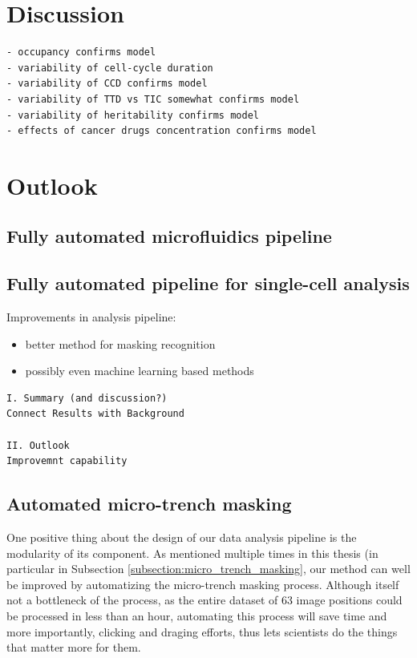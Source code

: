 \documentclass[pdftex,12pt,a4paper]{report}
\begin{document}

\section{Discussion}

\begin{verbatim}
- occupancy confirms model
- variability of cell-cycle duration
- variability of CCD confirms model
- variability of TTD vs TIC somewhat confirms model
- variability of heritability confirms model
- effects of cancer drugs concentration confirms model
\end{verbatim}

\section{Outlook}

\subsection{Fully automated microfluidics pipeline}

\subsection{Fully automated pipeline for single-cell analysis}


Improvements in analysis pipeline:

\begin{itemize}
\item better method for masking recognition
\item possibly even machine learning based methods
\end{itemize}

\begin{verbatim}
I. Summary (and discussion?)
Connect Results with Background

II. Outlook
Improvemnt capability
\end{verbatim}

\subsection{Automated micro-trench masking}

One positive thing about the design of our data analysis pipeline is the modularity of its component. As mentioned multiple times in this thesis (in particular in Subsection \ref{subsection:micro_trench_masking}, our method can well be improved by automatizing the micro-trench masking process. Although itself not a bottleneck of the process, as the entire dataset of 63 image positions could be processed in less than an hour, automating this process will save time and more importantly, clicking and draging efforts, thus lets scientists do the things that matter more for them.
\end{document}
